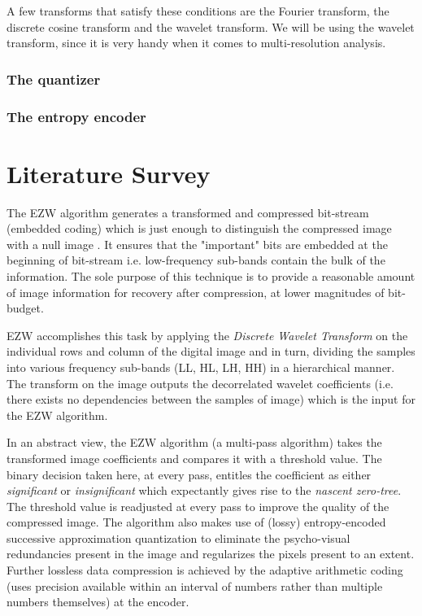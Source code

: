 \documentclass[a4paper,12pt]{report}
\begin{document}
A few transforms that satisfy these conditions are the Fourier transform, the
discrete cosine transform and the wavelet transform. We will be using the
wavelet transform, since it is very handy when it comes to multi-resolution
analysis.

\subsection{The quantizer}

\subsection{The entropy encoder}

\chapter{Literature Survey}
The EZW algorithm generates a transformed and compressed bit-stream (embedded
coding) which is just enough to distinguish the compressed image with a null
image \cite{shap1993}. It ensures that the "important" bits are embedded at the
beginning of bit-stream i.e. low-frequency sub-bands contain the bulk of the
information. The sole purpose of this technique is to provide a reasonable
amount of image information for recovery after compression, at lower magnitudes
of bit-budget.

\par

EZW accomplishes this task by applying the \textit{Discrete Wavelet Transform}
on the individual rows and column of the digital image and in turn, dividing
the samples into various frequency sub-bands (LL, HL, LH, HH) in a hierarchical
manner. The transform on the image outputs the decorrelated wavelet
coefficients (i.e. there exists no dependencies between the samples of image)
which is the input for the EZW algorithm.

\par

In an abstract view, the EZW algorithm (a multi-pass algorithm) takes the
transformed image coefficients and compares it with a threshold value. The
binary decision taken here, at every pass, entitles the coefficient as either
\textit{significant} or \textit{insignificant} which expectantly gives rise to
the \textit{nascent zero-tree}. The threshold value is readjusted at every pass
to improve the quality of the compressed image. The algorithm also makes use of
(lossy) entropy-encoded successive approximation quantization to eliminate the
psycho-visual redundancies present in the image and regularizes the pixels
present to an extent. Further lossless data compression is achieved by the
adaptive arithmetic coding (uses precision available within an interval of
numbers rather than multiple numbers themselves) at the encoder.
\end{document}
